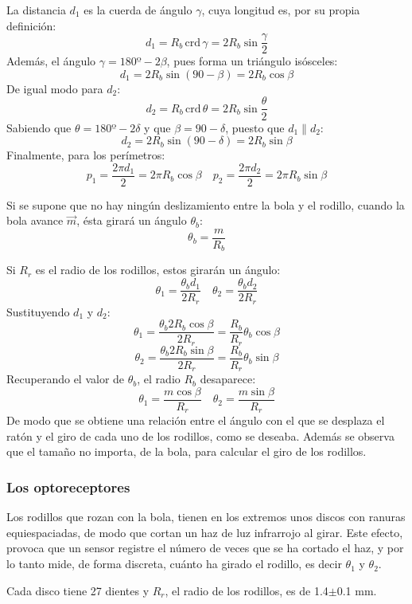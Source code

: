 \documentclass[10pt,a4paper,hidelinks,twocolumn]{article}
\begin{document}
La distancia $d_1$ es la cuerda de ángulo $\gamma$, cuya longitud es, por su 
propia definición:
$$ d_1 = R_b \, \text{crd} \, \gamma = 2R_b \sin \frac{\gamma}{2}$$
Además, el ángulo $\gamma = 180º - 2\beta$, pues forma un triángulo isósceles:
$$ d_1 = 2R_b \sin(90-\beta) = 2R_b\cos \beta$$
De igual modo para $d_2$:
$$ d_2 = R_b \, \text{crd} \, \theta = 2R_b \sin \frac{\theta}{2} $$
Sabiendo que $\theta = 180º - 2\delta$ y que $\beta = 90 - \delta$, puesto que 
$d_1 \parallel d_2$:
$$ d_2 = 2R_b \sin (90 - \delta) = 2R_b \sin \beta $$
Finalmente, para los perímetros:
$$ p_1 = \frac{2\pi d_1}{2} = 2 \pi R_b\cos \beta \quad  p_2 = \frac{2\pi 
d_2}{2} = 2 \pi R_b\sin \beta $$

Si se supone que no hay ningún deslizamiento entre la bola y el rodillo, cuando 
la bola avance $\vec{m}$, ésta girará un ángulo $\theta_b$:
$$ \theta_b = \frac{m}{R_b} $$

Si $R_r$ es el radio de los rodillos, estos girarán un ángulo:
$$ \theta_1 = \frac{\theta_b d_1}{2R_r} \quad
	\theta_2 = \frac{\theta_b d_2}{2R_r}$$
Sustituyendo $d_1$ y $d_2$:
$$ \theta_1 = \frac{\theta_b 2R_b\cos \beta}{2R_r} =
	\frac{R_b}{R_r}\theta_b\cos \beta$$
$$ \theta_2 = \frac{\theta_b 2R_b\sin \beta}{2R_r} =
	\frac{R_b}{R_r}\theta_b\sin \beta$$
Recuperando el valor de $\theta_b$, el radio $R_b$ desaparece:
\begin{equation}
\theta_1 = \frac{m \cos \beta}{R_r} \quad
\theta_2 = \frac{m \sin \beta}{R_r} \label{eq:bola-angulo}
\end{equation}
De modo que se obtiene una relación entre el ángulo con el que se desplaza el 
ratón y el giro de cada uno de los rodillos, como se deseaba. Además se observa 
que el tamaño no importa, de la bola, para calcular el giro de los rodillos.
\subsubsection{Los optoreceptores}

Los rodillos que rozan con la bola, tienen en los extremos unos discos con
ranuras equiespaciadas, de modo que cortan un haz de luz infrarrojo al girar.  
Este efecto, provoca que un sensor registre el número de veces que se ha cortado 
el haz, y por lo tanto mide, de forma discreta, cuánto ha girado el rodillo, es 
decir $\theta_1$ y $\theta_2$.


Cada disco tiene 27 dientes y $R_r$, el radio de los rodillos, es de 
1.4$\pm$0.1 mm.
\end{document}

